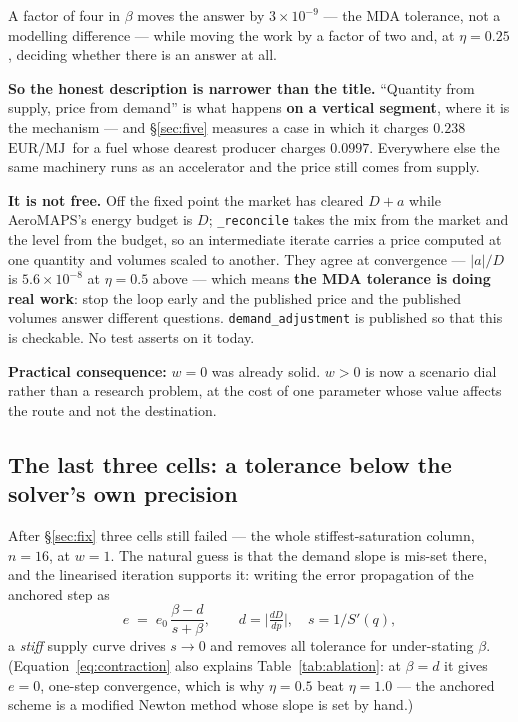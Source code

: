 \documentclass[11pt,a4paper]{article}
\newcommand{\var}[1]{\texttt{\small #1}}
\newcommand{\EURMJ}{\ensuremath{\mathrm{EUR}/\mathrm{MJ}}}
\begin{document}
\begin{keybox}
A factor of four in $\beta$ moves the answer by $3\times10^{-9}$ --- the MDA tolerance,
not a modelling difference --- while moving the work by a factor of two and, at
$\eta = 0.25$, deciding whether there is an answer at all.

\medskip
\textbf{So the honest description is narrower than the title.} ``Quantity from supply,
price from demand'' is what happens \textbf{on a vertical segment}, where it is the
mechanism --- and \S\ref{sec:five} measures a case in which it charges $0.238$\,\EURMJ\
for a fuel whose dearest producer charges $0.0997$. Everywhere else the same machinery
runs as an accelerator and the price still comes from supply.

\medskip
\textbf{It is not free.} Off the fixed point the market has cleared $D + a$ while
AeroMAPS's energy budget is $D$; \var{\_reconcile} takes the mix from the market and the
level from the budget, so an intermediate iterate carries a price computed at one quantity
and volumes scaled to another. They agree at convergence --- $|a|/D$ is $5.6\times10^{-8}$
at $\eta=0.5$ above --- which means \textbf{the MDA tolerance is doing real work}: stop the
loop early and the published price and the published volumes answer different questions.
\var{demand\_adjustment} is published so that this is checkable. No test asserts on it
today.
\end{keybox}

\textbf{Practical consequence:} $w=0$ was already solid. $w>0$ is now a scenario dial
rather than a research problem, at the cost of one parameter whose value affects the
route and not the destination.

\subsection{The last three cells: a tolerance below the solver's own precision}
\label{sec:tolerance}

After \S\ref{sec:fix} three cells still failed --- the whole stiffest-saturation column,
$n=16$, at $w=1$. The natural guess is that the demand slope is mis-set there, and the
linearised iteration supports it: writing the error propagation of the anchored step as
\begin{equation}
e \;=\; e_0\,\frac{\beta - d}{s + \beta},
\qquad d = \Big|\tfrac{dD}{dp}\Big|,\quad s = 1/S'(q),
\label{eq:contraction}
\end{equation}
a \emph{stiff} supply curve drives $s \to 0$ and removes all tolerance for under-stating
$\beta$. (Equation~\eqref{eq:contraction} also explains Table~\ref{tab:ablation}: at
$\beta = d$ it gives $e = 0$, one-step convergence, which is why $\eta=0.5$ beat
$\eta=1.0$ --- the anchored scheme is a modified Newton method whose slope is set by hand.)
\end{document}
